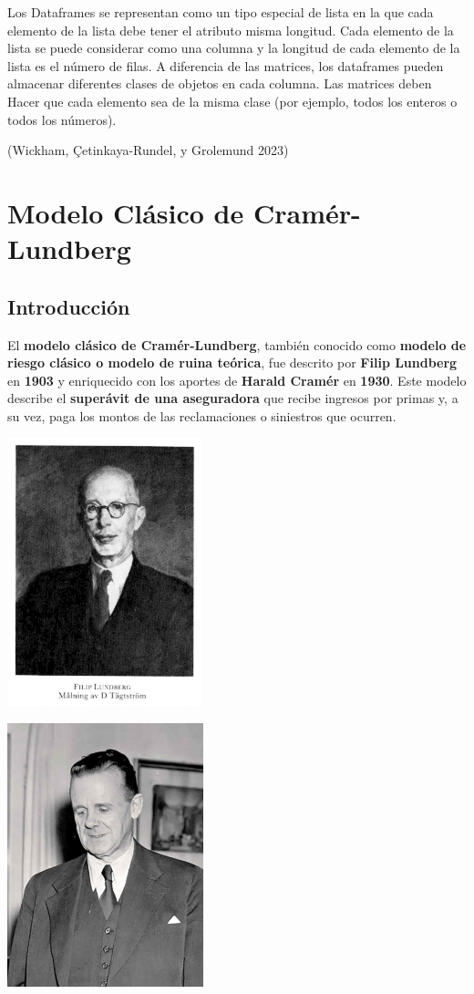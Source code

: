 \documentclass[
  us-letterpaper,
]{scrreprt}
\theoremstyle{definition}
\theoremstyle{plain}
\theoremstyle{plain}
\theoremstyle{remark}
\begin{document}
Los Dataframes se representan como un tipo especial de lista en la que
cada elemento de la lista debe tener el atributo misma longitud. Cada
elemento de la lista se puede considerar como una columna y la longitud
de cada elemento de la lista es el número de filas. A diferencia de las
matrices, los dataframes pueden almacenar diferentes clases de objetos
en cada columna. Las matrices deben Hacer que cada elemento sea de la
misma clase (por ejemplo, todos los enteros o todos los números).

(Wickham, Çetinkaya-Rundel, y Grolemund 2023)


\chapter{Modelo Clásico de Cramér-Lundberg}\label{sec-modelo_C_L}

\section{Introducción}\label{introducciuxf3n-1}

El \textbf{modelo clásico de Cramér-Lundberg}, también conocido como
\textbf{modelo de riesgo clásico o modelo de ruina teórica}, fue
descrito por \textbf{Filip Lundberg} en \textbf{1903} y enriquecido con
los aportes de \textbf{Harald Cramér} en \textbf{1930}. Este modelo
describe el \textbf{superávit de una aseguradora} que recibe ingresos
por primas y, a su vez, paga los montos de las reclamaciones o
siniestros que ocurren.

\includegraphics[width=2.21875in,height=\textheight]{Filip_Lundberg.jpg}

\includegraphics[width=2.23958in,height=\textheight]{harald-cramr.jpg}
\end{document}
